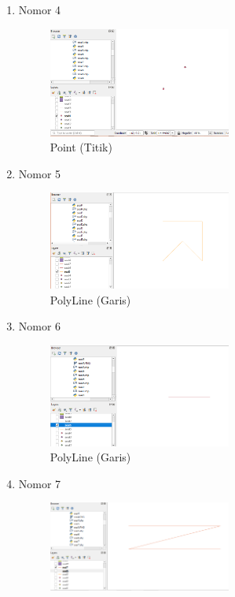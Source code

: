 \begin{enumerate}
	\item Nomor 4
	
	\begin{figure}[H]
		\includegraphics[width=6cm]{figures/Tugas2/1174074/soal4.png}
		\centering
		\caption{Point (Titik)}
	\end{figure}
	\item Nomor 5
	
	\begin{figure}[H]
		\includegraphics[width=6cm]{figures/Tugas2/1174074/soal5.png}
		\centering
		\caption{PolyLine (Garis)}
	\end{figure}
	\item Nomor 6
	
	\begin{figure}[H]
		\includegraphics[width=6cm]{figures/Tugas2/1174074/soal6.png}
		\centering
		\caption{PolyLine (Garis)}
	\end{figure}
	\item Nomor 7
	
	\begin{figure}[H]
		\includegraphics[width=6cm]{figures/Tugas2/1174074/soal7.png}

\end{figure}
\end{enumerate}
